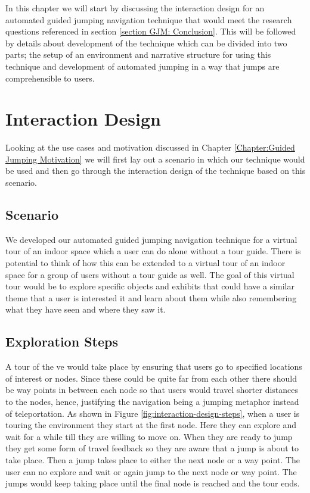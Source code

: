 \label{Chapter:Automated Guided Jumping}
In this chapter we will start by discussing the interaction design for an automated guided jumping navigation technique that would meet the research questions referenced in section \ref{section GJM: Conclusion}. This will be followed by details about development of the technique which can be divided into two parts; the setup of an environment and narrative structure for using this technique and development of automated jumping in a way that jumps are comprehensible to users. 

\section{Interaction Design}
\label{section AGJ: Interaction Design}
Looking at the use cases and motivation discussed in Chapter \ref{Chapter:Guided Jumping Motivation} we will first lay out a scenario in which our technique would be used and then go through the interaction design of the technique based on this scenario.

\subsection{Scenario}
\label{subsection AGJ ID: Scenario}
We developed our automated guided jumping navigation technique  for a virtual tour of an indoor space which a user can do alone without a tour guide. There is potential to think of how this can be extended to a virtual tour of an indoor space for a group of users without a tour guide as well. The goal of this virtual tour would be to explore specific objects and exhibits that could have a similar theme that a user is interested it and learn about them while also remembering what they have seen and where they saw it. 

\subsection{Exploration Steps}
\label{subsection AGJ ID: Exploration Steps}
A tour of the \acrshort{ve} would take place by ensuring that users go to specified locations of interest or nodes. Since these could be quite far from each other there should be way points in between each node so that users would travel shorter distances to the nodes, hence, justifying the navigation being a jumping metaphor instead of teleportation. As shown in Figure \ref{fig:interaction-design-steps}, when a user is touring the environment they start at the first node. Here they can explore and wait for a while till they are willing to move on. When they are ready to jump they get some form of travel feedback so they are aware that a jump is about to take place. Then a jump takes place to either the next node or a way point. The user can no explore and wait or again jump to the next node or way point. The jumps would keep taking place until the final node is reached and the tour ends. 

